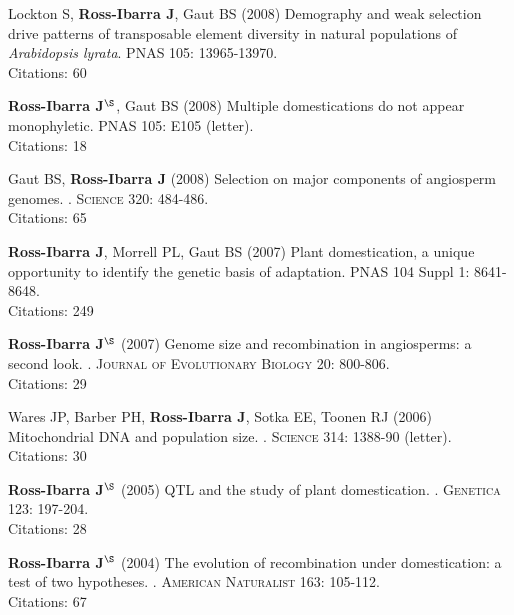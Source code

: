 \documentclass[letterpaper,10pt]{article}
\begin{document}
\begin{etaremune}
\item Lockton S, {\bf Ross-Ibarra J}, Gaut BS (2008) Demography and weak selection drive patterns of transposable element diversity in natural populations of \emph{Arabidopsis lyrata}. PNAS 105: 13965-13970.
\\Citations: 60\\


\item {\bf Ross-Ibarra J}$^\S$, Gaut BS (2008) Multiple domestications do not appear monophyletic. PNAS 105: E105 (letter).
\\Citations: 18\\


\item Gaut BS, {\bf Ross-Ibarra J} (2008) Selection on major components of angiosperm genomes. . \textsc{Science} 320: 484-486.
\\Citations: 65\\


\item {\bf Ross-Ibarra J}, Morrell PL, Gaut BS (2007) Plant domestication, a unique opportunity to identify the genetic basis of adaptation. PNAS 104 Suppl 1: 8641-8648.
\\Citations: 249\\


\item {\bf Ross-Ibarra J}$^\S$ (2007) Genome size and recombination in angiosperms: a second look. . \textsc{Journal of Evolutionary Biology} 20: 800-806.
\\Citations: 29\\


\item Wares JP, Barber PH, {\bf Ross-Ibarra J}, Sotka EE, Toonen RJ (2006) Mitochondrial DNA and population size. . \textsc{Science} 314: 1388-90 (letter).
\\Citations: 30\\


\item {\bf Ross-Ibarra J}$^\S$ (2005) QTL and the study of plant domestication. . \textsc{Genetica} 123: 197-204.
\\Citations: 28\\


\item {\bf Ross-Ibarra J}$^\S$ (2004) The evolution of recombination under domestication: a test of two hypotheses. . \textsc{American Naturalist} 163: 105-112.
\\Citations: 67\\



\end{etaremune}
\end{document}
